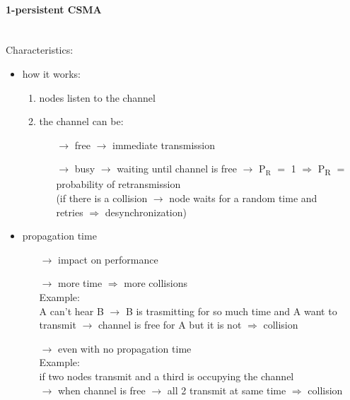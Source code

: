 \paragraph{1-persistent CSMA}\mbox{}\\[0.2cm]
Characteristics:
\begin{itemize}
    \item how it works:
    \begin{enumerate}
        \item nodes listen to the channel
        \item the channel can be:
        \begin{itemize}
            \item[$\rightarrow$] free $\rightarrow$ immediate transmission
            \item[$\rightarrow$] busy $\rightarrow$ waiting until channel is free $\rightarrow$ $\text{P}_\text{R}$ $=$ 1
            \newpage
            $\Rightarrow$ P\textsubscript{R} $=$ probability of retransmission\\
            (if there is a collision $\rightarrow$ node waits for a random
            time and\\retries $\Rightarrow$ desynchronization)
        \end{itemize}
    \end{enumerate}
    \item propagation time
    \begin{itemize}
        \item[$\rightarrow$] impact on performance
        \item[$\rightarrow$] more time $\Rightarrow$ more collisions\\
        Example:\\
        A can't hear B $\rightarrow$ B is trasmitting for so much time and A want to transmit
        $\rightarrow$ channel is free for A but it is not $\Rightarrow$ collision
        \item[$\rightarrow$] even with no propagation time\\
        Example:\\if two nodes transmit and a third is occupying the channel\\
        $\rightarrow$ when channel is free $\rightarrow$ all 2 transmit at
        same time $\Rightarrow$ collision
    \end{itemize}
\end{itemize}

